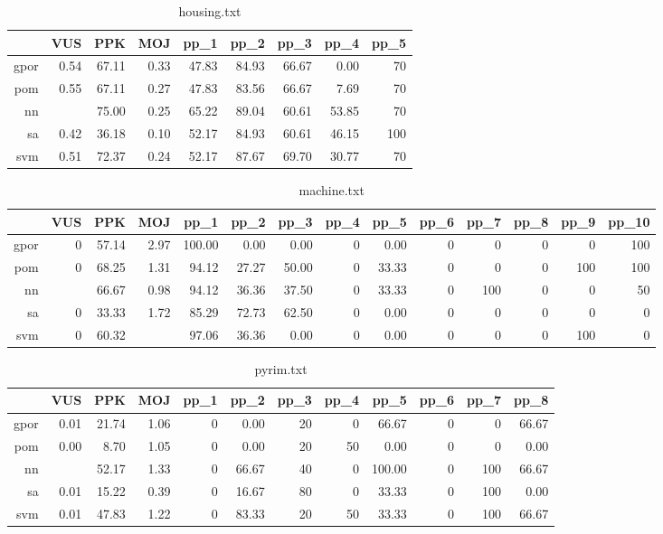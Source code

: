 \documentclass{mini}
\begin{document}
\begin{table}[ht]
\centering
\begin{tabular}{rrrrrrrrr}
\hline
& VUS & PPK & MOJ & pp\_1 & pp\_2 & pp\_3 & pp\_4 & pp\_5 \\
\hline
gpor & 0.54 & 67.11 & 0.33 & 47.83 & 84.93 & 66.67 & 0.00 & 70 \\
pom & 0.55 & 67.11 & 0.27 & 47.83 & 83.56 & 66.67 & 7.69 & 70 \\
nn & & 75.00 & 0.25 & 65.22 & 89.04 & 60.61 & 53.85 & 70 \\
sa & 0.42 & 36.18 & 0.10 & 52.17 & 84.93 & 60.61 & 46.15 & 100 \\
svm & 0.51 & 72.37 & 0.24 & 52.17 & 87.67 & 69.70 & 30.77 & 70 \\
\hline
\end{tabular}
\caption{housing.txt}
\end{table}
\begin{table}[ht]
\centering
\begin{tabular}{rrrrrrrrrrrrrr}
\hline
& VUS & PPK & MOJ & pp\_1 & pp\_2 & pp\_3 & pp\_4 & pp\_5 & pp\_6 & pp\_7 & pp\_8 & pp\_9 & pp\_10 \\
\hline
gpor & 0 & 57.14 & 2.97 & 100.00 & 0.00 & 0.00 & 0 & 0.00 & 0 & 0 & 0 & 0 & 100 \\
pom & 0 & 68.25 & 1.31 & 94.12 & 27.27 & 50.00 & 0 & 33.33 & 0 & 0 & 0 & 100 & 100 \\
nn & & 66.67 & 0.98 & 94.12 & 36.36 & 37.50 & 0 & 33.33 & 0 & 100 & 0 & 0 & 50 \\
sa & 0 & 33.33 & 1.72 & 85.29 & 72.73 & 62.50 & 0 & 0.00 & 0 & 0 & 0 & 0 & 0 \\
svm & 0 & 60.32 & & 97.06 & 36.36 & 0.00 & 0 & 0.00 & 0 & 0 & 0 & 100 & 0 \\
\hline
\end{tabular}
\caption{machine.txt}
\end{table}
\begin{table}[ht]
\centering
\begin{tabular}{rrrrrrrrrrrr}
\hline
& VUS & PPK & MOJ & pp\_1 & pp\_2 & pp\_3 & pp\_4 & pp\_5 & pp\_6 & pp\_7 & pp\_8 \\
\hline
gpor & 0.01 & 21.74 & 1.06 & 0 & 0.00 & 20 & 0 & 66.67 & 0 & 0 & 66.67 \\
pom & 0.00 & 8.70 & 1.05 & 0 & 0.00 & 20 & 50 & 0.00 & 0 & 0 & 0.00 \\
nn & & 52.17 & 1.33 & 0 & 66.67 & 40 & 0 & 100.00 & 0 & 100 & 66.67 \\
sa & 0.01 & 15.22 & 0.39 & 0 & 16.67 & 80 & 0 & 33.33 & 0 & 100 & 0.00 \\
svm & 0.01 & 47.83 & 1.22 & 0 & 83.33 & 20 & 50 & 33.33 & 0 & 100 & 66.67 \\
\hline
\end{tabular}
\caption{pyrim.txt}
\end{table}
\end{document}
